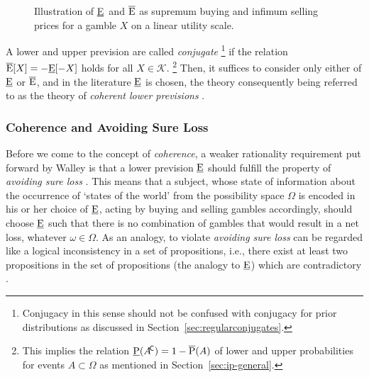 \begin{figure}
\centering
{}
\caption[Illustration of \underline{E}\ and $\Eu$ as supremum buying and infimum selling prices]{\label{fig:pricesforgambles}%
Illustration of \underline{E}\ and $\Eu$ as supremum buying and infimum selling prices for a gamble $X$ on a linear utility scale.}
\end{figure}

A lower and upper prevision are called \emph{conjugate}%
\footnote{Conjugacy in this sense should not be confused
with conjugacy for prior distributions as discussed in Section~\ref{sec:regularconjugates}.}
if the relation $\overline{\operatorname{E}}[X] = -\underline{\operatorname{E}}[-X]$ holds for all $X \in \mathcal{K}$.%
\footnote{This implies the relation $\underline{\operatorname{P}}(A^{{\mbox{\!\scriptsize\textsf{C}}}}) = 1 - \overline{\operatorname{P}}(A)$
of lower and upper probabilities for events $A \subset \Omega$
as mentioned in Section~\ref{sec:ip-general}.}
Then, it suffices to consider only either of $\underline{\operatorname{E}}$ or $\Eu$,
and in the literature $\underline{\operatorname{E}}$ is chosen,
the theory consequently being referred to as the theory of
\emph{coherent lower previsions} \parencite[see, e.g.,][\S 3.2]{itip}.

\subsubsection{Coherence and Avoiding Sure Loss}

Before we come to the concept of \emph{coherence},
a weaker rationality requirement put forward by Walley is
that a lower prevision $\underline{\operatorname{E}}$ should fulfill the property of
\emph{avoiding sure loss} \parencite[\S 2.4]{1991:walley}.
This means that a subject, whose state of information about the
occurrence of `states of the world' from the possibility space $\Omega$
is encoded in his or her choice of $\underline{\operatorname{E}}$,
acting by buying and selling gambles accordingly,
should choose $\underline{\operatorname{E}}$ such that there is no combination of gambles
that would result in a net loss, whatever $\omega \in \Omega$.
As an analogy, to violate \emph{avoiding sure loss} can be regarded
like a logical inconsistency in a set of propositions,
i.e., there exist at least two propositions in the set of propositions
(the analogy to $\underline{\operatorname{E}}$) which are contradictory
\parencite[\S 2.4, footnote~1]{1991:walley}.

